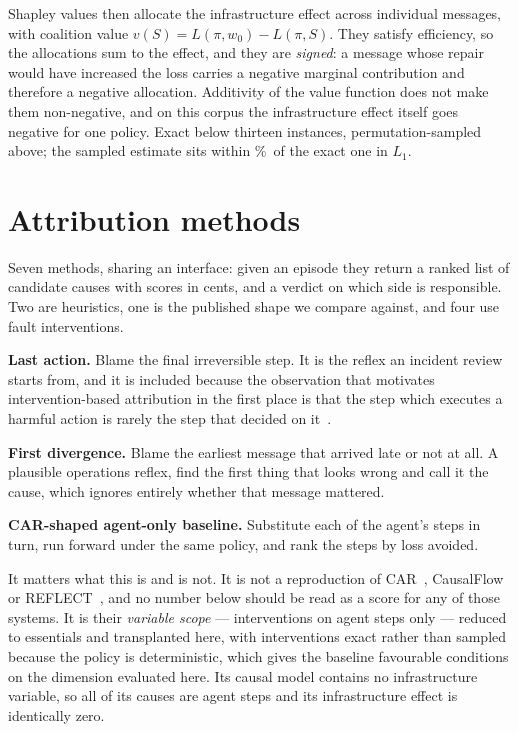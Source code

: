 \documentclass[conference]{IEEEtran}
\begin{document}
Shapley values then allocate the infrastructure effect across individual
messages, with coalition value $v(S) = L(\pi, w_0) - L(\pi, S)$. They satisfy
efficiency, so the allocations sum to the effect, and they are \emph{signed}:
a message whose repair would have increased the loss carries a negative
marginal contribution and therefore a negative allocation. Additivity of the
value function does not make them non-negative, and on this corpus the
infrastructure effect itself goes negative for one policy. Exact below
thirteen instances, permutation-sampled above; the sampled estimate sits within
\shapleyError\%\ of the exact one in $L_1$.

\section{Attribution methods}
\label{sec:methods}

Seven methods, sharing an interface: given an episode they return a ranked list
of candidate causes with scores in cents, and a verdict on which side is
responsible. Two are heuristics, one is the published shape we compare against,
and four use fault interventions.

\textbf{Last action.} Blame the final irreversible step. It is the reflex an
incident review starts from, and it is included because the observation that
motivates intervention-based attribution in the first place is that the step
which executes a harmful action is rarely the step that decided on
it~\cite{car}.

\textbf{First divergence.} Blame the earliest message that arrived late or not
at all. A plausible operations reflex, find the first thing that looks wrong
and call it the cause, which ignores entirely whether that message mattered.

\textbf{CAR-shaped agent-only baseline.} Substitute each of the agent's steps
in turn, run forward under the same policy, and rank the steps by loss
avoided.

It matters what this is and is not. It is not a reproduction of
CAR~\cite{car}, CausalFlow~\cite{causalflow} or REFLECT~\cite{reflect}, and no
number below should be read as a score for any of those systems. It is their
\emph{variable scope} --- interventions on agent steps only --- reduced to
essentials and transplanted here, with interventions exact rather than sampled because the policy is
deterministic, which gives the baseline favourable conditions on the dimension
evaluated here. Its
causal model contains no infrastructure variable, so all of its causes are
agent steps and its infrastructure effect is identically zero.
\end{document}
